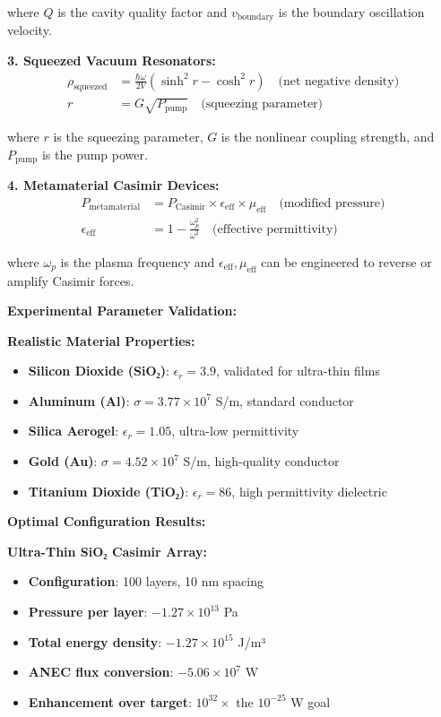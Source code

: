 \documentclass[11pt]{article}
\begin{document}
where $Q$ is the cavity quality factor and $v_{\text{boundary}}$ is the boundary oscillation velocity.

\textbf{3. Squeezed Vacuum Resonators:}
\begin{align}
\rho_{\text{squeezed}} &= \frac{\hbar \omega}{2V} \left(\sinh^2 r - \cosh^2 r\right) \quad \text{(net negative density)} \\
r &= G \sqrt{P_{\text{pump}}} \quad \text{(squeezing parameter)}
\end{align}

where $r$ is the squeezing parameter, $G$ is the nonlinear coupling strength, and $P_{\text{pump}}$ is the pump power.

\textbf{4. Metamaterial Casimir Devices:}
\begin{align}
P_{\text{metamaterial}} &= P_{\text{Casimir}} \times \epsilon_{\text{eff}} \times \mu_{\text{eff}} \quad \text{(modified pressure)} \\
\epsilon_{\text{eff}} &= 1 - \frac{\omega_p^2}{\omega^2} \quad \text{(effective permittivity)}
\end{align}

where $\omega_p$ is the plasma frequency and $\epsilon_{\text{eff}}, \mu_{\text{eff}}$ can be engineered to reverse or amplify Casimir forces.

\textbf{Experimental Parameter Validation:}

\textbf{Realistic Material Properties:}
\begin{itemize}
    \item \textbf{Silicon Dioxide (SiO₂)}: $\epsilon_r = 3.9$, validated for ultra-thin films
    \item \textbf{Aluminum (Al)}: $\sigma = 3.77 \times 10^7$ S/m, standard conductor
    \item \textbf{Silica Aerogel}: $\epsilon_r = 1.05$, ultra-low permittivity
    \item \textbf{Gold (Au)}: $\sigma = 4.52 \times 10^7$ S/m, high-quality conductor
    \item \textbf{Titanium Dioxide (TiO₂)}: $\epsilon_r = 86$, high permittivity dielectric
\end{itemize}

\textbf{Optimal Configuration Results:}

\textbf{Ultra-Thin SiO₂ Casimir Array:}
\begin{itemize}
    \item \textbf{Configuration}: 100 layers, 10 nm spacing
    \item \textbf{Pressure per layer}: $-1.27 \times 10^{13}$ Pa
    \item \textbf{Total energy density}: $-1.27 \times 10^{15}$ J/m³
    \item \textbf{ANEC flux conversion}: $-5.06 \times 10^7$ W
    \item \textbf{Enhancement over target}: $10^{32} \times$ the $10^{-25}$ W goal
\end{itemize}
\end{document}
